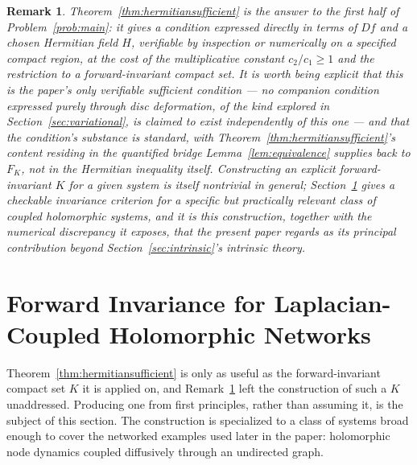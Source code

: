 \documentclass[preprint,12pt,authoryear]{elsarticle}
\newtheorem{remark}{Remark}
\begin{document}
\begin{remark}
\label{rem:practicality}
Theorem~\ref{thm:hermitiansufficient} is the answer to the first half of Problem~\ref{prob:main}: it gives a condition expressed directly in terms of $Df$ and a chosen Hermitian field $H$, verifiable by inspection or numerically on a specified compact region, at the cost of the multiplicative constant $c_2/c_1\ge1$ and the restriction to a forward-invariant compact set. It is worth being explicit that this is the paper's \emph{only} verifiable sufficient condition — no companion condition expressed purely through disc deformation, of the kind explored in Section~\ref{sec:variational}, is claimed to exist independently of this one — and that the condition's substance is standard, with Theorem~\ref{thm:hermitiansufficient}'s content residing in the quantified bridge Lemma~\ref{lem:equivalence} supplies back to $F_K$, not in the Hermitian inequality itself. Constructing an explicit forward-invariant $K$ for a given system is itself nontrivial in general; Section~\ref{sec:invariance} gives a checkable invariance criterion for a specific but practically relevant class of coupled holomorphic systems, and it is this construction, together with the numerical discrepancy it exposes, that the present paper regards as its principal contribution beyond Section~\ref{sec:intrinsic}'s intrinsic theory.
\end{remark}

%
%
%

\section{Forward Invariance for Laplacian-Coupled Holomorphic Networks}
\label{sec:invariance}

Theorem~\ref{thm:hermitiansufficient} is only as useful as the forward-invariant compact set $K$ it is applied on, and Remark~\ref{rem:practicality} left the construction of such a $K$ unaddressed. Producing one from first principles, rather than assuming it, is the subject of this section. The construction is specialized to a class of systems broad enough to cover the networked examples used later in the paper: holomorphic node dynamics coupled diffusively through an undirected graph.
\end{document}
